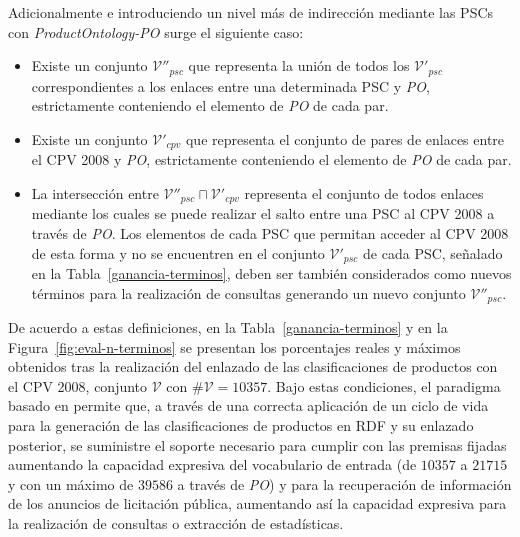 \documentclass[a4paper,final,11pt,fleqn,twoside]{book}  %
\begin{document}
Adicionalmente e introduciendo un nivel más de indirección mediante las PSCs con \textit{ProductOntology-PO} surge el siguiente caso:
\begin{itemize}
 \item Existe un conjunto $\mathcal{V''}_{psc}$ que representa la unión de todos los $\mathcal{V'}_{psc}$ correspondientes 
a los enlaces entre una determinada PSC y \textit{PO}, estrictamente conteniendo el elemento de \textit{PO} de cada par.
\item Existe un conjunto $\mathcal{V'}_{cpv}$ que representa el conjunto de pares de enlaces entre el CPV 2008 y \textit{PO}, 
estrictamente conteniendo el elemento de \textit{PO} de cada par.
\item La intersección entre $\mathcal{V''}_{psc} \sqcap \mathcal{V'}_{cpv}$ representa el conjunto de todos enlaces mediante 
los cuales se puede realizar el salto entre una PSC al CPV 2008 a través de \textit{PO}. Los elementos 
de cada PSC que permitan acceder al CPV 2008 de esta forma y no se encuentren en el conjunto $\mathcal{V'}_{psc}$ de cada PSC, señalado 
en la Tabla~\ref{ganancia-terminos}, deben ser también considerados como nuevos términos para la realización de consultas generando 
un nuevo conjunto $\mathcal{V''}_{psc}$.
\end{itemize}

De acuerdo a estas definiciones, en la Tabla~\ref{ganancia-terminos} y en la Figura~\ref{fig:eval-n-terminos} 
se presentan los porcentajes reales y máximos obtenidos tras la realización del enlazado de las clasificaciones 
de productos con el CPV 2008, conjunto $\mathcal{V}$ con $\#\mathcal{V} = 10357$. Bajo estas condiciones, 
el paradigma basado en \linkeddata permite que, a través de una correcta aplicación de un ciclo de vida para la generación 
de las clasificaciones de productos en RDF y su enlazado posterior, se suministre el soporte necesario para cumplir con 
las premisas fijadas aumentando la capacidad expresiva del vocabulario de entrada (de $10357$ a $21715$ y con 
un máximo de $39586$ a través de \textit{PO}) y para la recuperación de información de los anuncios de licitación pública, 
aumentando así la capacidad expresiva para la realización de consultas o extracción de estadísticas. 
\end{document}

